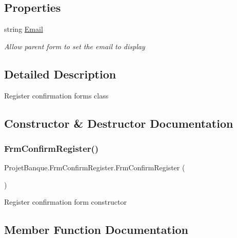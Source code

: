 \subsection*{Properties}
\begin{DoxyCompactItemize}
\item 
string \mbox{\hyperlink{class_projet_banque_1_1_frm_confirm_register_af97db583e5c4a63b7f1c442bd026f5e3}{Email}}
\begin{DoxyCompactList}\small\item\em Allow parent form to set the email to display \end{DoxyCompactList}\end{DoxyCompactItemize}


\subsection{Detailed Description}
Register confirmation form\textquotesingle{}s class 



\subsection{Constructor \& Destructor Documentation}
\mbox{\label{class_projet_banque_1_1_frm_confirm_register_ad6b8f42b87fdba0cfa30aae8213b36fd}} 
\subsubsection{\texorpdfstring{FrmConfirmRegister()}{FrmConfirmRegister()}}
{\footnotesize\ttfamily Projet\+Banque.\+Frm\+Confirm\+Register.\+Frm\+Confirm\+Register (\begin{DoxyParamCaption}{ }\end{DoxyParamCaption})}



Register confirmation form constructor 



\subsection{Member Function Documentation}
\mbox{\label{class_projet_banque_1_1_frm_confirm_register_a56116491cf6a86487631b8c7f941b107}} 
